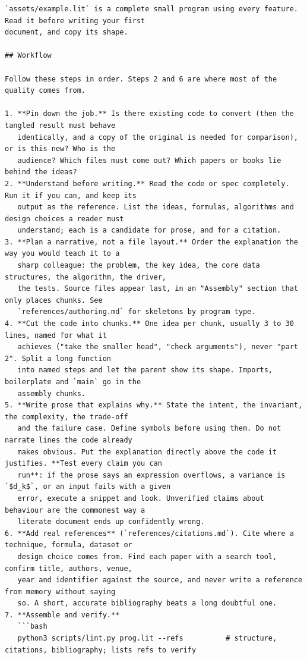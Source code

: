 \documentclass[10pt,a4paper]{article}
\newcounter{chunk}
\begin{document}
\begin{Verbatim}
`assets/example.lit` is a complete small program using every feature. Read it before writing your first
document, and copy its shape.

## Workflow

Follow these steps in order. Steps 2 and 6 are where most of the quality comes from.

1. **Pin down the job.** Is there existing code to convert (then the tangled result must behave
   identically, and a copy of the original is needed for comparison), or is this new? Who is the
   audience? Which files must come out? Which papers or books lie behind the ideas?
2. **Understand before writing.** Read the code or spec completely. Run it if you can, and keep its
   output as the reference. List the ideas, formulas, algorithms and design choices a reader must
   understand; each is a candidate for prose, and for a citation.
3. **Plan a narrative, not a file layout.** Order the explanation the way you would teach it to a
   sharp colleague: the problem, the key idea, the core data structures, the algorithm, the driver,
   the tests. Source files appear last, in an "Assembly" section that only places chunks. See
   `references/authoring.md` for skeletons by program type.
4. **Cut the code into chunks.** One idea per chunk, usually 3 to 30 lines, named for what it
   achieves ("take the smaller head", "check arguments"), never "part 2". Split a long function
   into named steps and let the parent show its shape. Imports, boilerplate and `main` go in the
   assembly chunks.
5. **Write prose that explains why.** State the intent, the invariant, the complexity, the trade-off
   and the failure case. Define symbols before using them. Do not narrate lines the code already
   makes obvious. Put the explanation directly above the code it justifies. **Test every claim you can
   run**: if the prose says an expression overflows, a variance is `$d_k$`, or an input fails with a given
   error, execute a snippet and look. Unverified claims about behaviour are the commonest way a
   literate document ends up confidently wrong.
6. **Add real references** (`references/citations.md`). Cite where a technique, formula, dataset or
   design choice comes from. Find each paper with a search tool, confirm title, authors, venue,
   year and identifier against the source, and never write a reference from memory without saying
   so. A short, accurate bibliography beats a long doubtful one.
7. **Assemble and verify.**
   ```bash
   python3 scripts/lint.py prog.lit --refs          # structure, citations, bibliography; lists refs to verify

\end{Verbatim}
\end{document}
